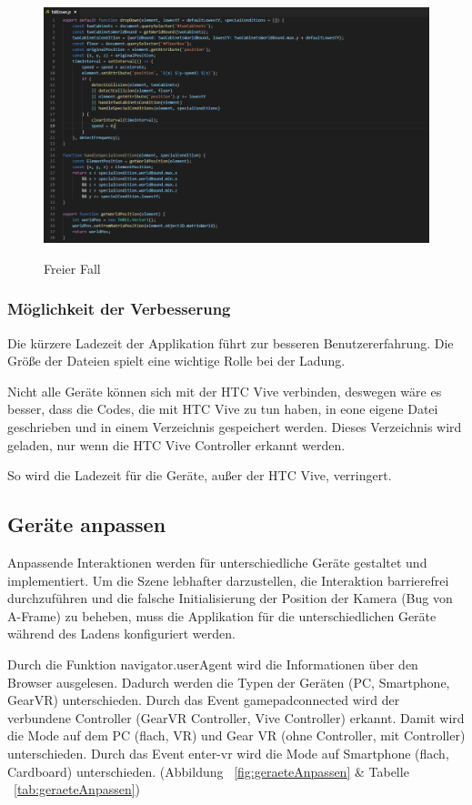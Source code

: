 \begin{figure}[ht]
\vspace*{1em}
\centering
\caption[Freier Fall]{Freier Fall}
\includegraphics[width=\textwidth]{images/fallDown.png}
\label{fig:fallDown} 
\end{figure}
  
  \subsubsection{Möglichkeit der Verbesserung}
  Die kürzere Ladezeit der Applikation führt zur besseren Benutzererfahrung. Die Größe der Dateien spielt eine wichtige Rolle bei der Ladung.
  
  Nicht alle Geräte können sich mit der HTC Vive verbinden, deswegen wäre es besser, dass die Codes, die mit HTC Vive zu tun haben, in eone eigene Datei geschrieben und in einem Verzeichnis gespeichert werden. Dieses Verzeichnis wird geladen, nur wenn die HTC Vive Controller erkannt werden.
  
  So wird die Ladezeit für die Geräte, außer der HTC Vive, verringert.
  
 \subsection{Geräte anpassen}
 Anpassende Interaktionen werden für unterschiedliche Geräte gestaltet und implementiert. Um die Szene lebhafter darzustellen, die Interaktion barrierefrei durchzuführen und die falsche Initialisierung der Position der Kamera (Bug von A-Frame) zu beheben, muss die Applikation für die unterschiedlichen Geräte während des Ladens konfiguriert werden.
 
 Durch die Funktion {\selectfont navigator.userAgent} wird die Informationen über den Browser ausgelesen. Dadurch werden die Typen der Geräten (PC, Smartphone, GearVR) unterschieden. Durch das Event {\selectfont gamepadconnected} wird der verbundene Controller (GearVR Controller, Vive Controller) erkannt. Damit wird die Mode auf dem PC (flach, VR) und Gear VR (ohne Controller, mit Controller) unterschieden. Durch das Event {\selectfont enter-vr} wird die Mode auf Smartphone (flach, Cardboard) unterschieden. (Abbildung ~\ref{fig:geraeteAnpassen} \& Tabelle ~\ref{tab:geraeteAnpassen}) 
 

